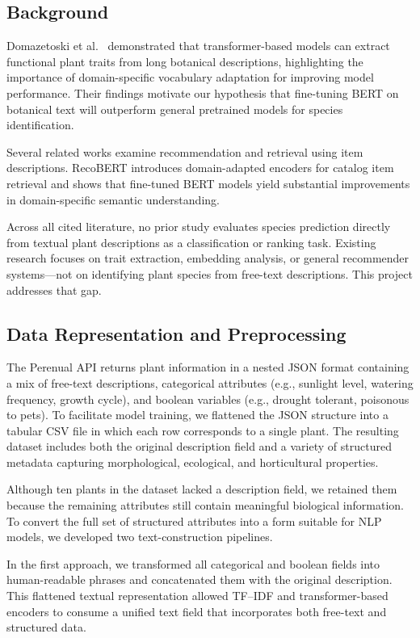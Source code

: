 \documentclass[11pt]{article}
\begin{document}
\subsection{Background}
Domazetoski et al.~ \cite{domazetoski2025planttraits} demonstrated that transformer-based models can extract
functional plant traits from long botanical descriptions, highlighting the importance
of domain-specific vocabulary adaptation for improving model performance. Their findings
motivate our hypothesis that fine-tuning BERT on botanical text will outperform general
pretrained models for species identification.

Several related works examine recommendation and retrieval using item descriptions.
RecoBERT \cite{malkiel2020recobert} introduces domain-adapted encoders for catalog item retrieval
and shows that fine-tuned BERT models yield substantial improvements in domain-specific
semantic understanding.

Across all cited literature, no prior study evaluates species prediction directly from
textual plant descriptions as a classification or ranking task. Existing research focuses
on trait extraction, embedding analysis, or general recommender systems---not on
identifying plant species from free-text descriptions. This project addresses that gap.

\subsection{Data Representation and Preprocessing}
The Perenual API returns plant information in a nested JSON format containing a mix
of free-text descriptions, categorical attributes (e.g., sunlight level, watering
frequency, growth cycle), and boolean variables (e.g., drought tolerant, poisonous
to pets). To facilitate model training, we flattened the JSON structure into a tabular
CSV file in which each row corresponds to a single plant. The resulting dataset
includes both the original description field and a variety of structured metadata
capturing morphological, ecological, and horticultural properties.

Although ten plants in the dataset lacked a description field, we retained them
because the remaining attributes still contain meaningful biological information.
To convert the full set of structured attributes into a form suitable for NLP models,
we developed two text-construction pipelines.

In the first approach, we transformed all categorical and boolean fields into
human-readable phrases and concatenated them with the original description. This
flattened textual representation allowed TF--IDF and transformer-based encoders to
consume a unified text field that incorporates both free-text and structured data.
\end{document}
